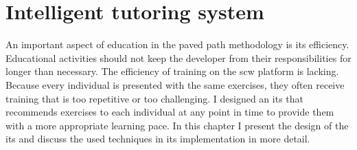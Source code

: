 \chapter{Intelligent tutoring system}
\label{ch:its-implementation}
An important aspect of education in the paved path methodology is its efficiency.
Educational activities should not keep the developer from their responsibilities for longer than necessary.
The efficiency of training on the \gls{scw} platform is lacking.
Because every individual is presented with the same exercises, they often receive training that is too repetitive or too challenging.
I designed an \gls{its} that recommends exercises to each individual at any point in time to provide them with a more appropriate learning pace.
In this chapter I present the design of the \gls{its} and discuss the used techniques in its implementation in more detail.





